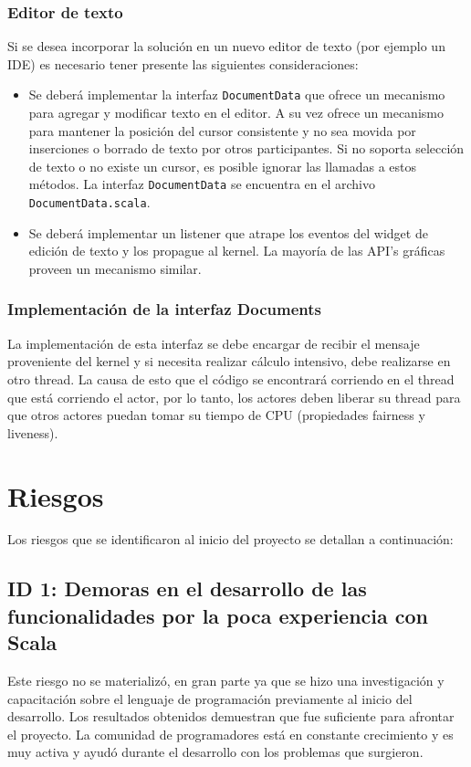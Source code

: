 \documentclass[12pt,a4paper]{article}
\let\stdsection\section
\renewcommand\section{\newpage\stdsection}
\begin{document}
\subsubsection{Editor de texto}
Si se desea incorporar la solución en un nuevo editor de texto (por ejemplo un IDE) es necesario tener presente 
las siguientes consideraciones:

	\begin{itemize}
		\item Se deberá implementar la interfaz \texttt{DocumentData} que ofrece un mecanismo para agregar y modificar texto en el editor. 
		A su vez ofrece un mecanismo para mantener la posición del cursor consistente y no sea movida por inserciones o
		borrado de texto por otros participantes. Si no soporta selección de texto o no existe un cursor, es posible ignorar
		las llamadas a estos métodos.
		La interfaz \texttt{DocumentData} se encuentra en el archivo \texttt{DocumentData.scala}.
		\item  Se deberá implementar un listener que atrape los eventos del widget de edición de texto y los propague al kernel.
		La mayoría de las API’s gráficas proveen un mecanismo similar.
	\end{itemize}


\subsubsection{Implementación de la interfaz Documents}
La implementación de esta interfaz se debe encargar de recibir el mensaje proveniente del kernel y si necesita realizar
cálculo intensivo, debe realizarse en otro thread. La causa de esto que el código se encontrará corriendo en el thread que
está corriendo el actor, por lo tanto, los actores deben liberar su thread para que otros actores puedan tomar su tiempo de CPU
(propiedades fairness y liveness).

\section{Riesgos}

Los riesgos que se identificaron al inicio del proyecto se detallan a continuación:

\subsection{ID 1: Demoras en el desarrollo de las funcionalidades por la poca experiencia con Scala}
Este riesgo no se materializó, en gran parte ya que se hizo una investigación y capacitación sobre el lenguaje de
programación previamente al inicio del desarrollo. Los resultados obtenidos demuestran que fue suficiente
para afrontar el proyecto. La comunidad de programadores está en constante crecimiento y es muy activa y ayudó
durante el desarrollo con los problemas que surgieron.
\end{document}
